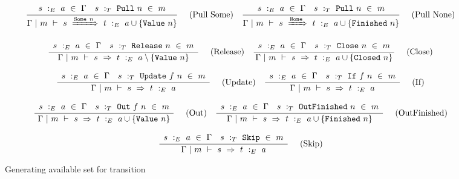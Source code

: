 
\begin{figure*}

$$
\frac {\displaystyle 
    \begin{array}{lr}
        s~:_E~ a ~\in~ \Gamma                    &
        s ~:_T~ \mathtt{Pull}~n ~\in~m 
    \end{array}
} {\displaystyle  
    \Gamma ~|~ m ~\vdash~ s~\xRightarrow{ \mathtt{Some}~n }~t ~:_E~  a \cup \{ \mathtt{Value}~n \} 
} \ 
\quad
\textrm{(Pull Some)}
\quad
\frac {\displaystyle 
    \begin{array}{lr}
        s~:_E~ a ~\in~ \Gamma                    &
        s ~:_T~ \mathtt{Pull}~n ~\in~m
    \end{array}
} {\displaystyle  
    \Gamma ~|~ m ~\vdash~ s~\xRightarrow{ \mathtt{None}}~t ~:_E~  a \cup \{ \mathtt{Finished}~n \} 
} \ 
\quad
\textrm{(Pull None)}
$$

$$
\frac {\displaystyle 
    \begin{array}{lr}
        s~:_E~ a ~\in~ \Gamma                        &
        s ~:_T~ \mathtt{Release}~n ~\in~m
    \end{array}
} {\displaystyle  
    \Gamma ~|~ m ~\vdash~ s~\Rightarrow~t ~:_E~  a \setminus \{ \mathtt{Value}~n \} 
} \ 
\quad
\textrm{(Release)}
\quad
\frac {\displaystyle 
    \begin{array}{lr}
        s~:_E~ a ~\in~ \Gamma                    &
        s ~:_T~ \mathtt{Close}~n ~\in~m
    \end{array}
} {\displaystyle  
    \Gamma ~|~ m ~\vdash~ s~\Rightarrow~t ~:_E~  a \cup \{ \mathtt{Closed}~n \} 
} \ 
\quad
\textrm{(Close)}
$$

$$
\frac {\displaystyle 
    \begin{array}{lr}
        s~:_E~ a ~\in~ \Gamma                        &
        s ~:_T~ \mathtt{Update}~f~n ~\in~m
    \end{array}
} {\displaystyle  
    \Gamma ~|~ m ~\vdash~ s~\Rightarrow~t ~:_E~  a 
} \ 
\quad
\textrm{(Update)}
\quad
\frac {\displaystyle 
    \begin{array}{lr}
        s~:_E~ a ~\in~ \Gamma                    &
        s ~:_T~ \mathtt{If}~f~n ~\in~m
    \end{array}
} {\displaystyle  
    \Gamma ~|~ m ~\vdash~ s~\Rightarrow~t ~:_E~  a 
} \ 
\quad
\textrm{(If)}
$$

$$
\frac {\displaystyle 
    \begin{array}{lr}
        s~:_E~ a ~\in~ \Gamma                      &
        s ~:_T~ \mathtt{Out}~f~n ~\in~m
    \end{array}
} {\displaystyle  
    \Gamma ~|~ m ~\vdash~ s~\Rightarrow~t ~:_E~  a \cup \{ \mathtt{Value}~n \} 
} \ 
\quad
\textrm{(Out)}
\quad
\frac {\displaystyle 
    \begin{array}{lr}
        s~:_E~ a ~\in~ \Gamma                           &
        s ~:_T~ \mathtt{OutFinished}~n ~\in~m
    \end{array}
} {\displaystyle  
    \Gamma ~|~ m ~\vdash~ s~\Rightarrow~t ~:_E~  a \cup \{ \mathtt{Finished}~n \} 
} \ 
\quad
\textrm{(OutFinished)}
$$

$$
\frac {\displaystyle 
    \begin{array}{lr}
        s~:_E~ a ~\in~ \Gamma                 &
        s ~:_T~ \mathtt{Skip} ~\in~m
    \end{array}
} {\displaystyle  
    \Gamma ~|~ m ~\vdash~ s~\Rightarrow~t ~:_E~  a 
} \ 
\quad
\textrm{(Skip)}
$$


\caption{Generating available set for transition}
\label{fig:inv:generation}
\end{figure*}

